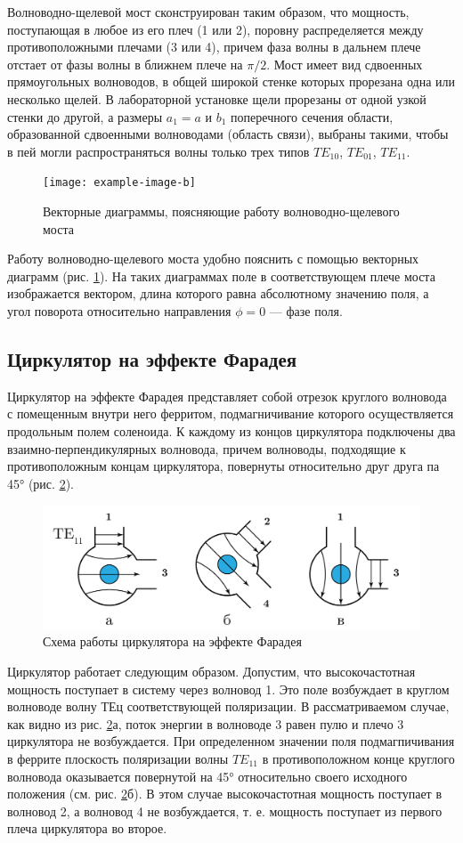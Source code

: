 Волноводно-щелевой мост сконструирован таким образом, что мощность, поступающая в любое из его плеч (1 или 2), поровну
распределяется между противоположными плечами (3 или 4), причем фаза волны в дальнем плече отстает от фазы волны в
ближнем плече на $\pi/2$. Мост имеет вид сдвоенных прямоугольных волноводов, в общей широкой стенке которых прорезана одна
или несколько щелей. В лабораторной установке щели прорезаны от одной узкой стенки до другой, а размеры $a_1=a$ и $b_1$
поперечного сечения области, образованной сдвоенными волноводами (область связи), выбраны такими, чтобы в пей могли
распространяться волны только трех типов $TE_{10}$, $TE_{01}$, $TE_{11}$.
\begin{figure}[h!]
    \centering
    \texttt{[image: example-image-b]}
    \caption{Векторные диаграммы, поясняющие работу волноводно-щелевого моста}
    \label{fig:ex:2}
\end{figure}
Работу волноводно-щелевого моста удобно пояснить с помощью векторных диаграмм (рис. \ref{fig:ex:2}). На таких диаграммах поле в
соответствующем плече моста изображается вектором, длина которого равна абсолютному значению поля, а угол поворота
относительно направления $\phi = 0$ — фазе поля. 

\subsection{Циркулятор на эффекте Фарадея}
Циркулятор на эффекте Фарадея представляет собой отрезок круглого волновода с помещенным внутри него ферритом,
подмагничивание которого осуществляется продольным полем соленоида. К каждому из концов циркулятора подключены два
взаимно-перпендикулярных волновода, причем волноводы, подходящие к противоположным концам циркулятора, повернуты
относительно друг друга па 45° (рис. \ref{fig:exp:circulator}).
\begin{figure}[h!]
    \centering
    \includegraphics[width = 0.8\linewidth]{imgs/circulator.pdf}
    \caption{Схема работы циркулятора на эффекте Фарадея}
    \label{fig:exp:circulator}
\end{figure}
Циркулятор работает следующим образом. Допустим, что высокочастотная мощность поступает в систему через волновод 1. Это
поле возбуждает в круглом волноводе волну ТЕц соответствующей поляризации. В рассматриваемом случае, как видно из рис.
\ref{fig:exp:circulator}а, поток энергии в волноводе 3 равен пулю и плечо 3 циркулятора не возбуждается. При определенном значении поля
подмагпичивания в феррите плоскость поляризации волны $TE_{11}$ в противоположном конце круглого волновода оказывается
повернутой на 45° относительно своего исходного положения (см. рис. \ref{fig:exp:circulator}б). В этом случае высокочастотная мощность
поступает в волновод 2, а волновод 4 не возбуждается, т. е. мощность поступает из первого плеча циркулятора во второе.

